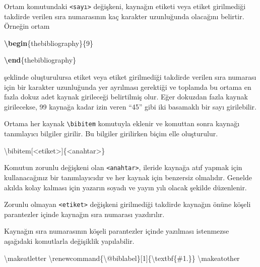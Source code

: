 \documentclass[
  10pt,
]{scrbook}
\newenvironment{Shaded}{}{}
\newcommand{\ExtensionTok}[1]{#1}
\newcommand{\FunctionTok}[1]{\textcolor[rgb]{0.02,0.16,0.49}{#1}}
\newcommand{\KeywordTok}[1]{\textcolor[rgb]{0.00,0.44,0.13}{\textbf{#1}}}
\newcommand{\NormalTok}[1]{#1}
\theoremstyle{definition}
\theoremstyle{definition}
\theoremstyle{definition}
\theoremstyle{definition}
\theoremstyle{remark}
\begin{document}
Ortam komutundaki \texttt{\textless{}sayı\textgreater{}} değişkeni, kaynağın etiketi veya etiket girilmediği takdirde verilen sıra numarasının kaç karakter uzunluğunda olacağını belirtir. Örneğin ortam

\begin{Shaded}
\begin{Highlighting}[]
\KeywordTok{\textbackslash{}begin}\NormalTok{\{}\ExtensionTok{thebibliography}\NormalTok{\}\{9\}}
        
\KeywordTok{\textbackslash{}end}\NormalTok{\{}\ExtensionTok{thebibliography}\NormalTok{\}}
\end{Highlighting}
\end{Shaded}

şeklinde oluşturulursa etiket veya etiket girilmediği takdirde verilen sıra numarası için bir karakter uzunluğunda yer ayrılması gerektiği ve toplamda bu ortama en fazla dokuz adet kaynak girileceği belirtilmiş olur. Eğer dokuzdan fazla kaynak girilecekse, 99 kaynağa kadar izin veren ``45'' gibi iki basamaklı bir sayı girilebilir.

Ortama her kaynak \texttt{\textbackslash{}bibitem} komutuyla eklenir ve komuttan sonra kaynağı tanımlayıcı bilgiler girilir. Bu bilgiler girilirken biçim elle oluşturulur.

\begin{Shaded}
\begin{Highlighting}[]
\FunctionTok{\textbackslash{}bibitem}\NormalTok{[\textless{}etiket\textgreater{}]\{\textless{}anahtar\textgreater{}\}}
\end{Highlighting}
\end{Shaded}

Komutun zorunlu değişkeni olan \texttt{\textless{}anahtar\textgreater{}}, ileride kaynağa atıf yapmak için kullanacağınız bir tanımlayıcıdır ve her kaynak için benzersiz olmalıdır. Genelde akılda kolay kalması için yazarın soyadı ve yayın yılı olacak şekilde düzenlenir.

Zorunlu olmayan \texttt{\textless{}etiket\textgreater{}} değişkeni girilmediği takdirde kaynağın önüne köşeli parantezler içinde kaynağın sıra numarası yazdırılır.

Kaynağın sıra numarasının köşeli parantezler içinde yazılması istenmezse aşağıdaki komutlarla değişiklik yapılabilir.

\begin{Shaded}
\begin{Highlighting}[]
\FunctionTok{\textbackslash{}makeatletter}
\FunctionTok{\textbackslash{}renewcommand}\NormalTok{\{}\ExtensionTok{\textbackslash{}@biblabel}\NormalTok{\}[1]\{}\FunctionTok{\textbackslash{}textbf}\NormalTok{\{\#1.\}\}}
\FunctionTok{\textbackslash{}makeatother}
\end{Highlighting}
\end{Shaded}
\end{document}
